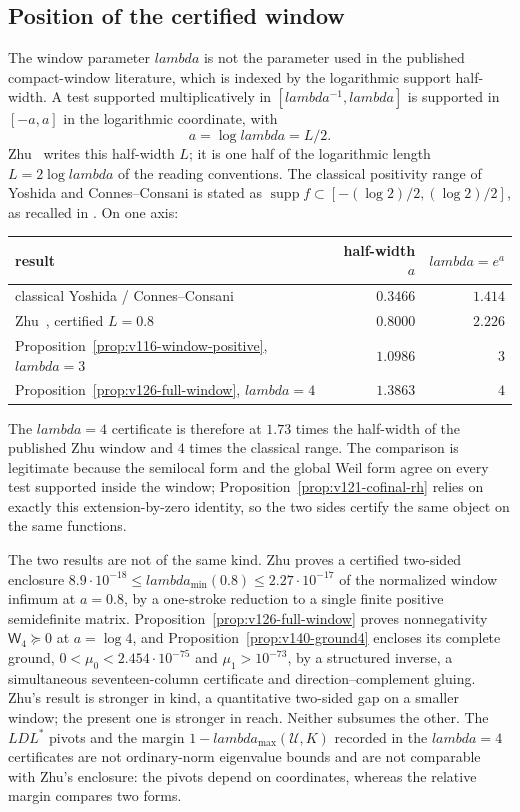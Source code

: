 \documentclass[11pt]{article}
\def\lambda{lambda}%
\theoremstyle{remark}
\begin{document}
\subsection{Position of the certified window}
\label{sec:v141-window-position}
The window parameter $\lambda$ is not the parameter used in the
published compact-window literature, which is indexed by the
logarithmic support half-width. A test supported multiplicatively in
$[\lambda^{-1},\lambda]$ is supported in $[-a,a]$ in the logarithmic
coordinate, with
\[
 a=\log\lambda=L/2 .
\]
Zhu~\cite{Zhu2026} writes this half-width $L$; it is one half of the
logarithmic length $L=2\log\lambda$ of the reading conventions. The
classical positivity range of Yoshida and Connes--Consani is stated
as $\operatorname{supp}f\subset[-(\log2)/2,(\log2)/2]$, as recalled in
\cite{Zhu2026}. On one axis:
\begin{center}
\begin{tabular}{lrr}
\toprule
result & half-width $a$ & $\lambda=e^{a}$\\
\midrule
classical Yoshida / Connes--Consani & $0.3466$ & $1.414$\\
Zhu~\cite{Zhu2026}, certified $L=0.8$ & $0.8000$ & $2.226$\\
Proposition~\ref{prop:v116-window-positive}, $\lambda=3$ & $1.0986$ & $3$\\
Proposition~\ref{prop:v126-full-window}, $\lambda=4$ & $1.3863$ & $4$\\
\bottomrule
\end{tabular}
\end{center}
The $\lambda=4$ certificate is therefore at $1.73$ times the
half-width of the published Zhu window and $4$ times the classical
range. The comparison is legitimate because the semilocal form and the
global Weil form agree on every test supported inside the window;
Proposition~\ref{prop:v121-cofinal-rh} relies on exactly this
extension-by-zero identity, so the two sides certify the same object
on the same functions.

The two results are not of the same kind. Zhu proves a certified
two-sided enclosure
$8.9\cdot10^{-18}\le\lambda_{\min}(0.8)\le2.27\cdot10^{-17}$ of the
normalized window infimum at $a=0.8$, by a one-stroke reduction to a
single finite positive semidefinite matrix.
Proposition~\ref{prop:v126-full-window} proves nonnegativity
$\mathsf W_4\succeq0$ at $a=\log4$, and
Proposition~\ref{prop:v140-ground4} encloses its complete ground,
$0<\mu_0<2.454\cdot10^{-75}$ and $\mu_1>10^{-73}$, by a structured
inverse, a simultaneous seventeen-column certificate and
direction--complement gluing. Zhu's result is stronger in kind, a
quantitative two-sided gap on a smaller window; the present one is
stronger in reach. Neither subsumes the other. The $LDL^*$ pivots and
the margin $1-\lambda_{\max}(\mathcal U,K)$ recorded in the
$\lambda=4$ certificates are not ordinary-norm eigenvalue bounds and are not comparable with
Zhu's enclosure: the pivots depend on coordinates, whereas the relative
margin compares two forms.
\end{document}
